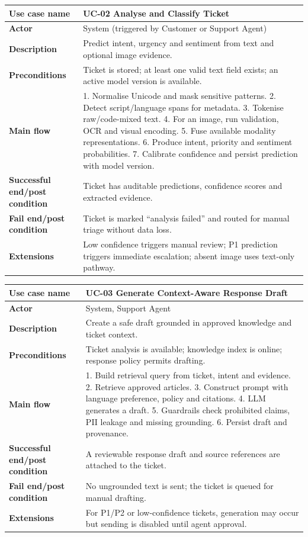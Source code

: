 \documentclass[10pt,letterpaper]{article}
\newenvironment{ucase}[1]{%
\begin{table}[H]\centering\small
\begin{tabular}{|L{1.62in}|L{4.50in}|}\hline
\textbf{Use case name} & \textbf{#1}\\\hline}{%
\end{tabular}\end{table}}
\begin{document}
\begin{ucase}{UC-02 Analyse and Classify Ticket}
\textbf{Actor} & System (triggered by Customer or Support Agent)\\\hline
\textbf{Description} & Predict intent, urgency and sentiment from text and optional image evidence.\\\hline
\textbf{Preconditions} & Ticket is stored; at least one valid text field exists; an active model version is available.\\\hline
\textbf{Main flow} & 1. Normalise Unicode and mask sensitive patterns. 2. Detect script/language spans for metadata. 3. Tokenise raw/code-mixed text. 4. For an image, run validation, OCR and visual encoding. 5. Fuse available modality representations. 6. Produce intent, priority and sentiment probabilities. 7. Calibrate confidence and persist prediction with model version.\\\hline
\textbf{Successful end/post condition} & Ticket has auditable predictions, confidence scores and extracted evidence.\\\hline
\textbf{Fail end/post condition} & Ticket is marked ``analysis failed'' and routed for manual triage without data loss.\\\hline
\textbf{Extensions} & Low confidence triggers manual review; P1 prediction triggers immediate escalation; absent image uses text-only pathway.\\\hline
\end{ucase}

\begin{ucase}{UC-03 Generate Context-Aware Response Draft}
\textbf{Actor} & System, Support Agent\\\hline
\textbf{Description} & Create a safe draft grounded in approved knowledge and ticket context.\\\hline
\textbf{Preconditions} & Ticket analysis is available; knowledge index is online; response policy permits drafting.\\\hline
\textbf{Main flow} & 1. Build retrieval query from ticket, intent and evidence. 2. Retrieve approved articles. 3. Construct prompt with language preference, policy and citations. 4. LLM generates a draft. 5. Guardrails check prohibited claims, PII leakage and missing grounding. 6. Persist draft and provenance.\\\hline
\textbf{Successful end/post condition} & A reviewable response draft and source references are attached to the ticket.\\\hline
\textbf{Fail end/post condition} & No ungrounded text is sent; the ticket is queued for manual drafting.\\\hline
\textbf{Extensions} & For P1/P2 or low-confidence tickets, generation may occur but sending is disabled until agent approval.\\\hline
\end{ucase}
\end{document}
